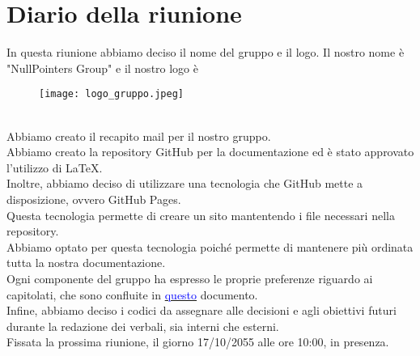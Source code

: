 \section{Diario della riunione}

	In questa riunione abbiamo deciso il nome del gruppo e il logo. Il nostro nome è "NullPointers Group" e il nostro logo è
	\begin{figure}[h]
		\begin{center}
			\texttt{[image: logo\_gruppo.jpeg]}
		\end{center}
	\end{figure}\\
	Abbiamo creato il recapito mail per il nostro gruppo.\\
	Abbiamo creato la repository GitHub per la documentazione ed è stato approvato l'utilizzo di LaTeX.\\
	Inoltre, abbiamo deciso di utilizzare una tecnologia che GitHub mette a disposizione, ovvero GitHub Pages.\\
	Questa tecnologia permette di creare un sito mantentendo i file necessari nella repository.\\
	Abbiamo optato per questa tecnologia poiché permette di mantenere più ordinata tutta la nostra documentazione.\\
    Ogni componente del gruppo ha espresso le proprie preferenze riguardo ai capitolati, che sono confluite in \href{https://docs.google.com/spreadsheets/d/1QaMKRtNCo9-x2O6sPm80BQgh0mwIuRUwIfmQZ6hzgeY/edit?gid=0#gid=0}{\textcolor{blue}{questo}} documento.\\
    Infine, abbiamo deciso i codici da assegnare alle decisioni e agli obiettivi futuri durante la redazione dei verbali, sia interni che esterni.\\
    Fissata la prossima riunione, il giorno 17/10/2055 alle ore 10:00, in presenza.